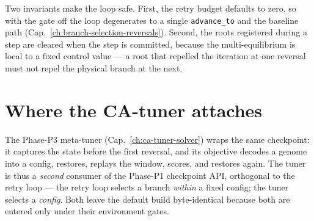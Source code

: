 Two invariants make the loop safe. First, the retry budget defaults to
zero, so with the gate off the loop degenerates to a single
\texttt{advance\_to} and the baseline path (Cap.~\ref{ch:branch-selection-reversals}).
Second, the roots registered during a step are cleared when the step is
committed, because the multi-equilibrium is local to a fixed control value
--- a root that repelled the iteration at one reversal must not repel the
physical branch at the next.

\section{Where the CA-tuner attaches}

The Phase-P3 meta-tuner (Cap.~\ref{ch:ca-tuner-solver}) wraps the same
checkpoint: it captures the state before the first reversal, and its
objective decodes a genome into a config, restores, replays the window,
scores, and restores again. The tuner is thus a \emph{second} consumer of
the Phase-P1 checkpoint API, orthogonal to the retry loop --- the retry
loop selects a branch \emph{within} a fixed config; the tuner selects a
\emph{config}. Both leave the default build byte-identical because both
are entered only under their environment gates.
